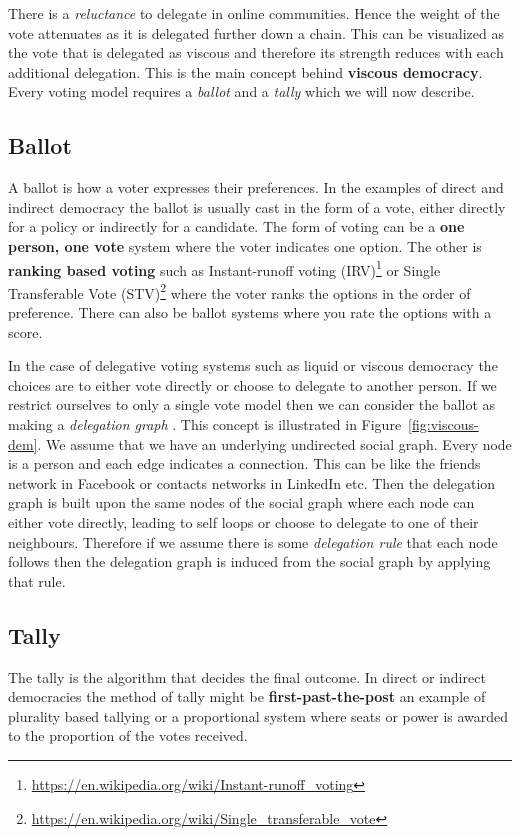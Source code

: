 There is a \textit{reluctance} to delegate in online communities. Hence the weight of the vote attenuates as it is delegated further down a chain. This can be visualized as the vote that is delegated as viscous and therefore its strength reduces with each additional delegation. This is the main concept behind \textbf{viscous democracy}. Every voting model requires a \emph{ballot} and a \emph{tally} which we will now describe.

\subsection{Ballot}
A ballot is how a voter expresses their preferences. In the examples of direct and indirect democracy the ballot is usually cast in the form of a vote, either directly for a policy or indirectly for a candidate. The form of voting can be a \textbf{one person, one vote} system where the voter indicates one option. The other is \textbf{ranking based voting} such as Instant-runoff voting (IRV)\footnote{\url{https://en.wikipedia.org/wiki/Instant-runoff_voting}} or Single Transferable Vote (STV)\footnote{\url{https://en.wikipedia.org/wiki/Single_transferable_vote}} where the voter ranks the options in the order of preference. There can also be ballot systems where you rate the options with a score.

In the case of delegative voting systems such as liquid or viscous democracy the choices are to either vote directly or choose to delegate to another person. If we restrict ourselves to only a single vote model then we can consider the ballot as making a \textit{delegation graph} \cite{ViscousDemocracy}. This concept is illustrated in Figure~\ref{fig:viscous-dem}. We assume that we have an underlying undirected social graph. Every node is a person and each edge indicates a connection. This can be like the friends network in Facebook or contacts networks in LinkedIn etc. Then the delegation graph is built upon the same nodes of the social graph where each node can either vote directly, leading to self loops or choose to delegate to one of their neighbours. Therefore if we assume there is some \textit{delegation rule} that each node follows then the delegation graph is induced from the social graph by applying that rule. 

\subsection{Tally}
\label{sec:tally}
The tally is the algorithm that decides the final outcome. In direct or indirect democracies the method of tally might be \textbf{first-past-the-post} an example of plurality based tallying or a proportional system where seats or power is awarded to the proportion of the votes received. 
 
